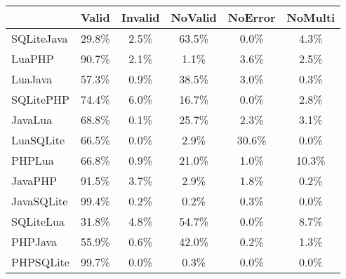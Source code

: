 \begin{tabular}{l  c  c  c  c  c }
    \toprule
        & Valid & Invalid & NoValid & NoError & NoMulti \\
    \midrule
    SQLiteJava & 29.8\% & 2.5\% & 63.5\% & 0.0\% & 4.3\% \\
    LuaPHP & 90.7\% & 2.1\% & 1.1\% & 3.6\% & 2.5\% \\
    LuaJava & 57.3\% & 0.9\% & 38.5\% & 3.0\% & 0.3\% \\
    SQLitePHP & 74.4\% & 6.0\% & 16.7\% & 0.0\% & 2.8\% \\
    JavaLua & 68.8\% & 0.1\% & 25.7\% & 2.3\% & 3.1\% \\
    LuaSQLite & 66.5\% & 0.0\% & 2.9\% & 30.6\% & 0.0\% \\
    PHPLua & 66.8\% & 0.9\% & 21.0\% & 1.0\% & 10.3\% \\
    JavaPHP & 91.5\% & 3.7\% & 2.9\% & 1.8\% & 0.2\% \\
    JavaSQLite & 99.4\% & 0.2\% & 0.2\% & 0.3\% & 0.0\% \\
    SQLiteLua & 31.8\% & 4.8\% & 54.7\% & 0.0\% & 8.7\% \\
    PHPJava & 55.9\% & 0.6\% & 42.0\% & 0.2\% & 1.3\% \\
    PHPSQLite & 99.7\% & 0.0\% & 0.3\% & 0.0\% & 0.0\% \\
    \bottomrule
\end{tabular}
        
